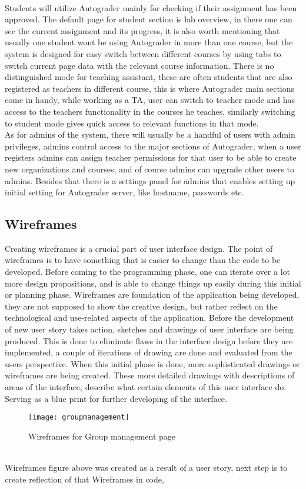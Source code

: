 \\Students will utilize Autograder mainly for checking if their assignment has been approved. The default page for student section is lab overview, in there one can see the current assignment and its progress, it is also worth mentioning that usually one student wont be using Autograder in more than one course, but the system is designed for easy switch between different courses by using tabs to switch current page data with the relevant course information. There is no distinguished mode for teaching assistant, these are often students that are also registered as teachers in different course, this is where Autograder main sections come in handy, while working as a TA, user can switch to teacher mode and has access to the teachers functionality in the courses he teaches, similarly switching to student mode gives quick access to relevant functions in that mode.
\\As for admins of the system, there will usually be a handful of users with admin privileges, admins control access to the major sections of Autograder, when a user registers admins can assign teacher permissions for that user to be able to create new organizations and courses, and of course admins can upgrade other users to admins. Besides that there is a settings panel for admins that enables setting up initial setting for Autograder server, like hostname, passwords etc.
\subsection{Wireframes}
Creating wireframes is a crucial part of user interface design. The point of wireframes is to have something that is easier to change than the code to be developed. Before coming to the programming phase, one can iterate over a lot more design propositions, and is able to change things up easily during this initial or planning phase. Wireframes are foundation of the application being developed, they are not supposed to show the creative design, but rather reflect on the technological and use-related aspects of the application. Before the development of new user story takes action, sketches and drawings of user interface are being produced. This is done to eliminate flaws in the interface design before they are implemented, a couple of iterations of drawing are done and evaluated from the users perspective. When this initial phase is done, more sophisticated drawings or wireframes are being created. These more detailed drawings with descriptions of areas of the interface, describe what certain elements of this user interface do. Serving as a blue print for further developing of the interface.
\begin{figure}[h]
  {\texttt{[image: groupmanagement]}}
  \caption{Wireframes for Group management page}
  \label{fig:groupmanagement}
\end{figure}
\\Wireframes figure above was created as a result of a user story, next step is to create reflection of that Wireframes in code, 

